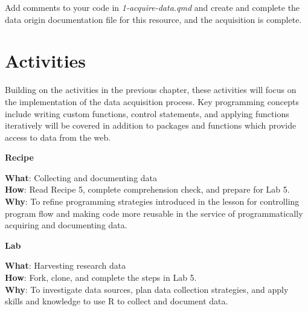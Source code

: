 \documentclass[
  letterpaper,
]{latex/krantz}
\theoremstyle{definition}
\theoremstyle{remark}
\begin{document}
Add comments to your code in \emph{1-acquire-data.qmd} and create and
complete the data origin documentation file for this resource, and the
acquisition is complete.

\section*{Activities}\label{activities-3}


Building on the activities in the previous chapter, these activities
will focus on the implementation of the data acquisition process. Key
programming concepts include writing custom functions, control
statements, and applying functions iteratively will be covered in
addition to packages and functions which provide access to data from the
web.

\begin{tcolorbox}[enhanced jigsaw, colframe=quarto-callout-color-frame, breakable, bottomrule=.15mm, arc=.35mm, left=2mm, opacityback=0, rightrule=.15mm, colback=white, toprule=.15mm, leftrule=.75mm]

\textbf{ Recipe}

\textbf{What}: Collecting and documenting data\\
\textbf{How}: Read Recipe 5, complete comprehension check, and prepare
for Lab 5.\\
\textbf{Why}: To refine programming strategies introduced in the lesson
for controlling program flow and making code more reusable in the
service of programmatically acquiring and documenting data.

\end{tcolorbox}

\begin{tcolorbox}[enhanced jigsaw, colframe=quarto-callout-color-frame, breakable, bottomrule=.15mm, arc=.35mm, left=2mm, opacityback=0, rightrule=.15mm, colback=white, toprule=.15mm, leftrule=.75mm]

\textbf{ Lab}

\textbf{What}: Harvesting research data\\
\textbf{How}: Fork, clone, and complete the steps in Lab 5.\\
\textbf{Why}: To investigate data sources, plan data collection
strategies, and apply skills and knowledge to use R to collect and
document data.

\end{tcolorbox}
\end{document}
